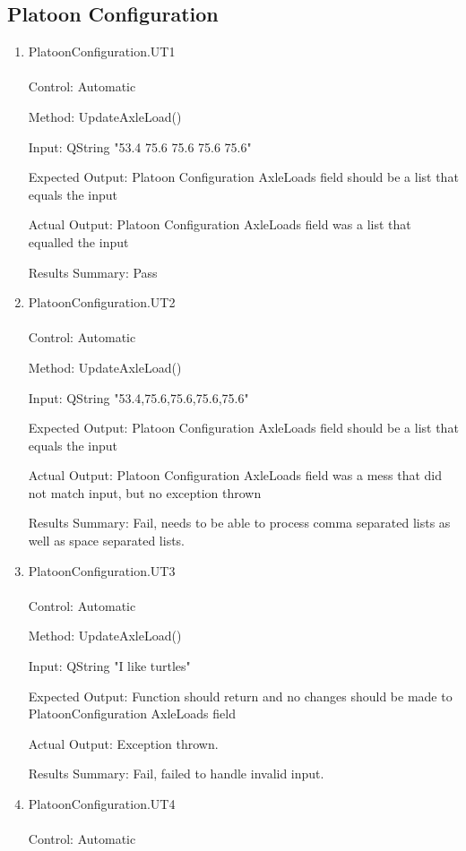 \documentclass[12pt, titlepage]{article}
\begin{document}
\subsection{Platoon Configuration}
\begin{enumerate}
\item{PlatoonConfiguration.UT1}\\\\
  Control: Automatic

  Method: UpdateAxleLoad()

  Input: QString "53.4 75.6 75.6 75.6 75.6"

  Expected Output: Platoon Configuration AxleLoads field should be a list that equals the input

  Actual Output: Platoon Configuration AxleLoads field was a list that equalled the input

  Results Summary: Pass
\item{PlatoonConfiguration.UT2}\\\\
  Control: Automatic

  Method: UpdateAxleLoad()

  Input: QString "53.4,75.6,75.6,75.6,75.6"

  Expected Output: Platoon Configuration AxleLoads field should be a list that equals the input

  Actual Output: Platoon Configuration AxleLoads field was a mess that did not match input, but no exception thrown

  Results Summary: Fail, needs to be able to process comma separated lists as well as space separated lists.

\item{PlatoonConfiguration.UT3}\\\\
  Control: Automatic

  Method: UpdateAxleLoad()

  Input: QString "I like turtles"

  Expected Output: Function should return and no changes should be made to PlatoonConfiguration AxleLoads field

  Actual Output: Exception thrown.

  Results Summary: Fail, failed to handle invalid input.

\item{PlatoonConfiguration.UT4}\\\\
  Control: Automatic


\end{enumerate}
\end{document}
